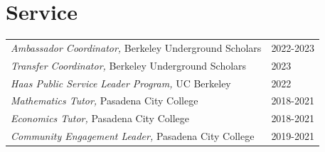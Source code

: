 \section{\sc Service}

\begin{tabular}{@{}p{4.25in}p{2in}}

\textit{Ambassador Coordinator,} Berkeley Underground Scholars & 2022-2023 \\

\textit{Transfer Coordinator,} Berkeley Underground Scholars  & 2023 \\

\textit{Haas Public Service Leader Program,} UC Berkeley & 2022 \\

\textit{Mathematics Tutor,} Pasadena City College & 2018-2021 \\

\textit{Economics Tutor,} Pasadena City College & 2018-2021 \\

\textit{Community Engagement Leader,} Pasadena City College & 2019-2021 \\



\end{tabular}
\endinput  



